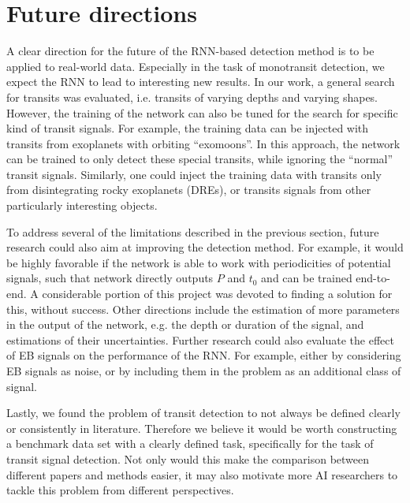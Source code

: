 
\section{Future directions}

A clear direction for the future of the RNN-based detection method is to be applied to real-world data. Especially in the task of monotransit detection, we expect the RNN to lead to interesting new results. In our work, a general search for transits was evaluated, i.e. transits of varying depths and varying shapes. However, the training of the network can also be tuned for the search for specific kind of transit signals. For example, the training data can be injected with transits from exoplanets with orbiting ``exomoons''.  In this approach, the network can be trained to only detect these special transits, while ignoring the ``normal'' transit signals. Similarly, one could inject the training data with transits only from disintegrating rocky exoplanets (DREs), or transits signals from other particularly interesting  objects.

To address several of the limitations described in the previous section, future research could also aim at improving the detection method. For example, it would be highly favorable if the network is able to work with periodicities of potential signals, such that network directly outputs $P$ and $t_0$ and can be trained end-to-end. A considerable portion of this project was devoted to finding a solution for this, without success.  Other directions include the
estimation of more parameters in the output of the network, e.g. the depth or duration of the signal, and estimations of their uncertainties. Further research could also evaluate the effect of EB signals on the performance of the RNN. For example, either by considering EB signals as noise, or by including them in the problem as an additional class of signal.

Lastly, we found the problem of transit detection to not always be defined clearly or consistently in literature.  Therefore we believe it would be worth constructing a benchmark data set with a clearly defined task, specifically for the task of transit signal detection. Not only would this make the comparison between different papers and methods easier, it may also motivate more AI researchers to tackle this problem from different perspectives.